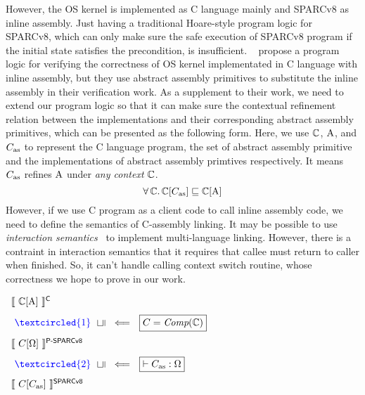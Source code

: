 However, the OS kernel is implemented as 
C language mainly and SPARCv8 as inline assembly. 
Just having a traditional Hoare-style 
program logic for SPARCv8, which can only make sure 
the safe execution of SPARCv8 program if the initial 
state satisfies the precondition, is insufficient.
~\cite{Xu16cav} propose a program logic for 
verifying the correctness of OS kernel implementated in 
C language with inline assembly, 
but they use abstract assembly primitives to 
substitute the inline assembly in their verification work.
As a supplement to their work, we need to extend our 
program logic so that it can make sure the  
contextual refinement relation between the implementations
and their corresponding abstract assembly primitives, 
which can be presented as the following form. Here,  
we use $\mathbb{C}$, $\text{A}$, and $C_{\text{as}}$ to represent 
the C language program, the set of abstract assembly 
primitive and the implementations of 
abstract assembly primtives respectively. 
It means $C_{\text{as}}$ refines $\text{A}$ under 
\textit{any context} $\mathbb{C}$. 
\[
    \forall \, \mathbb{C}. \, 
    \mathbb{C}[C_{\text{as}}] \sqsubseteq \mathbb{C}[\text{A}]
\]
However, if we use C program as a client code to 
call inline assembly code, we need to define the 
semantics of C-assembly linking. 
It may be possible to use
\textit{interaction semantics}~\cite{Stewart15popl}
to implement multi-language linking. However, 
there is a contraint in interaction semantics that 
it requires that callee must return to caller when 
finished. So, it can't handle calling context switch 
routine, whose correctness we hope to prove in our work. 
\begin{center}
    $
        \begin{array}{l}
            \semantics{\Clang[\AbsPrimC]}^{\textsf{C}}
            \\
            \\[-5pt]
            \ 
            {\color{blue} \textcircled{1}} \ \ 
            \rotatebox[origin=c]{90}{$\refine$} \ \  
            \Longleftarrow \ \ 
            \boxed{C = \textit{Comp}(\Clang)}
            \\
            \\[-5pt]
            \semantics{\code[\hprimset]}^{\textsf{P-SPARCv8}}
            \\
            \\[-5pt]
            \  
            {\color{blue} \textcircled{2}} \ \ 
            \rotatebox[origin=c]{90}{$\refine$} \ \ 
            \Longleftarrow \ \ 
            \boxed{\vdash\asmimp:\hprimset}
            \\
            \\[-5pt]
            \semantics{\code[\asmimp]}^{\textsf{SPARCv8}}
        \end{array}
    $
    \label{fig:idea to establish contextual refinement}
\end{center}
